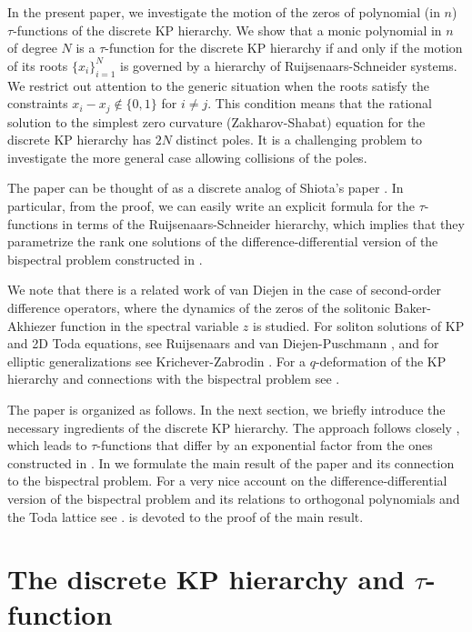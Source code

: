\documentclass[11pt,reqno]{amsart}
\theoremstyle{definition}
\numberwithin{equation}{section}
\begin{document}
In the present paper, we investigate 
the motion of the zeros of polynomial (in $n$) $\tau$-functions of the 
discrete KP hierarchy. We show that a monic polynomial in $n$ of degree $N$ is 
a $\tau$-function for the discrete KP hierarchy if and only if the motion of 
its roots $\{x_i\}_{i=1}^N$ is governed by a hierarchy of 
Ruijsenaars-Schneider systems. We restrict out attention to the generic 
situation when the roots satisfy the constraints $x_i-x_j\notin\{0,1\}$ for 
$i\neq j$. This condition means that the rational solution to the simplest 
zero curvature (Zakharov-Shabat) equation for the discrete KP hierarchy has 
$2N$ distinct poles. It is a challenging problem to investigate the more 
general case allowing collisions of the poles.

The paper can be thought of as a discrete analog of Shiota's paper \cite{Sh}. 
In particular, from the proof, we can easily write an explicit formula for 
the $\tau$-functions in terms of 
the Ruijsenaars-Schneider hierarchy, which implies that they parametrize 
the rank one solutions of the difference-differential version of 
the bispectral problem constructed in \cite{HI}.  

We note that there is a related work of van Diejen \cite{vD} in the case of 
second-order difference operators, where the dynamics of the zeros of the 
solitonic Baker-Akhiezer function in the 
spectral variable $z$ is studied. For soliton solutions of KP and 2D Toda 
equations, see Ruijsenaars \cite{R} and van Diejen-Puschmann \cite{vDP},
and for elliptic generalizations see 
Krichever-Zabrodin \cite{KZ}. For a $q$-deformation of the KP hierarchy and 
connections with the bispectral problem see \cite{I2}.

The paper is organized as follows. In the next section, we briefly introduce 
the necessary ingredients of the discrete KP hierarchy. The approach follows 
closely \cite{HI}, which leads to $\tau$-functions that differ by an 
exponential factor from the ones constructed in \cite{AvM,UT}. In 
 we formulate the main result of the paper and its connection to 
the bispectral problem. For a very nice account on the 
difference-differential version of the bispectral problem and its 
relations to orthogonal polynomials and the Toda lattice see \cite{H}.
 is devoted to the proof of the main result. 


\section{The discrete KP hierarchy and $\tau$-function}         \label{se2}
\end{document}
